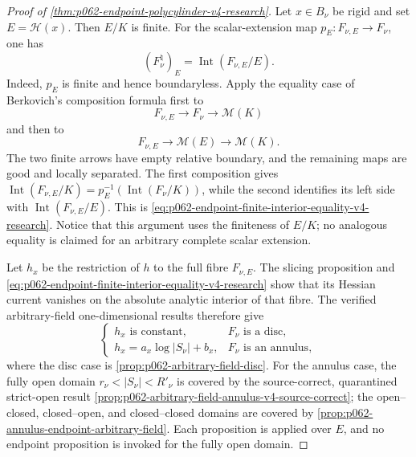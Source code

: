 \begin{proof}[Proof of \cref{thm:p062-endpoint-polycylinder-v4-research}]
Let \(x\in B_\nu\) be rigid and set \(E=\mathscr H(x)\).  Then \(E/K\) is
finite.  For the scalar-extension map
\(
 p_E\colon F_{\nu,E}\to F_\nu
\), one has
\begin{equation}\label{eq:p062-endpoint-finite-interior-equality-v4-research}
       (F_\nu^\natural)_E
       =\operatorname{Int}(F_{\nu,E}/E).
\end{equation}
Indeed, \(p_E\) is finite and hence boundaryless.  Apply the equality case
of Berkovich's composition formula first to
\[
 F_{\nu,E}\longrightarrow F_\nu\longrightarrow\mathcal M(K)
\]
and then to
\[
 F_{\nu,E}\longrightarrow\mathcal M(E)\longrightarrow\mathcal M(K).
\]
The two finite arrows have empty relative boundary, and the remaining maps
are good and locally separated.  The first composition gives
\(
 \operatorname{Int}(F_{\nu,E}/K)
   =p_E^{-1}(\operatorname{Int}(F_\nu/K))
\), while the second identifies its left side with
\(
 \operatorname{Int}(F_{\nu,E}/E)
\).  This is
\eqref{eq:p062-endpoint-finite-interior-equality-v4-research}.  Notice that
this argument uses the finiteness of \(E/K\); no analogous equality is
claimed for an arbitrary complete scalar extension.

Let \(h_x\) be the restriction of \(h\) to the full fibre
\(F_{\nu,E}\).  The slicing proposition and
\eqref{eq:p062-endpoint-finite-interior-equality-v4-research} show that its
Hessian current vanishes on the absolute analytic interior of that fibre.
The verified arbitrary-field one-dimensional results therefore give
\begin{equation}\label{eq:p062-endpoint-one-fibre-classification-v4-research}
 \begin{cases}
 h_x\text{ is constant},&F_\nu\text{ is a disc},\\
 h_x=a_x\log|S_\nu|+b_x,&F_\nu\text{ is an annulus},
 \end{cases}
\end{equation}
where the disc case is
\cref{prop:p062-arbitrary-field-disc}.  For the annulus case, the fully open
domain \(r_\nu<|S_\nu|<R'_\nu\) is covered by the source-correct, quarantined
strict-open result
\cref{prop:p062-arbitrary-field-annulus-v4-source-correct}; the open--closed,
closed--open, and closed--closed domains are covered by
\cref{prop:p062-annulus-endpoint-arbitrary-field}.  Each proposition is
applied over \(E\), and no endpoint proposition is invoked for the fully open
domain.


\end{proof}
